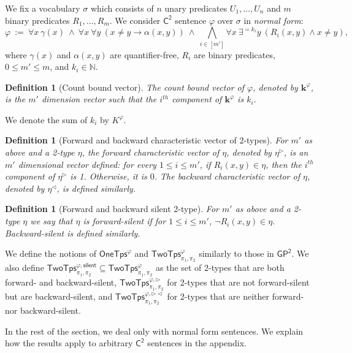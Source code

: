 \documentclass[10pt,a4paper]{article}
\newtheorem{definition}[theorem]{Definition}
\theoremstyle{definition}
\theoremstyle{remark}
\newcommand{\cK}{\mathsf{TwoTps}}
\newcommand{\bbN}{\mathbb{N}}
\newcommand{\bfk}{\mathbf{k}}
\newcommand{\vocab}{\sigma}
\newcommand{\Ctwo}    {\mathsf{C^2}}
\newcommand{\twotypes}{\mathsf{TwoTps}}
\newcommand{\Onetypes}{\mathsf{OneTps}}
\newcommand{\GPtwo}   {\mathsf{GP^2}}
\newcommand{\intsinterval}[1]{{\left[ #1 \right]}}
\newcommand{\trif} {\triangleright}
\newcommand{\trib} {\triangleleft}
\newcommand{\cKvpnull}  {\cK^{\varphi, \mathsf{silent}}}
\newcommand{\cKvpf}     {\cK^{\varphi, \trif}}
\newcommand{\cKvpfb}    {\cK^{\varphi, \trif\trib}}
\begin{document}
We fix a vocabulary $\vocab$ which consists of $n$ unary predicates $U_1, \ldots, U_n$ and $m$ binary predicates $R_1, \ldots, R_m$.
We consider $\Ctwo$ sentence $\varphi$ over $\vocab$ in \emph{normal form}:
\begin{equation*}
    \varphi\ :=\ 
    \forall x\ \gamma(x)\ \land\ 
    \forall x\ \forall y\ \left(x \neq y \to \alpha(x, y)\right)\ \land\ 
    \bigwedge_{i \in \intsinterval{m'}} \forall x\ \exists^{=k_i} y\ \left(R_i(x,y) \land x \neq y\right),
\end{equation*}
where $\gamma(x)$ and $\alpha(x, y)$ are quantifier-free,
$R_i$ are binary predicates,
$0 \le m' \le m$,
and $k_i \in \bbN$.

\begin{definition}[Count bound vector]
The count bound vector of $\varphi$, denoted by $\bfk^\varphi$, 
is the $m'$ dimension vector such that
the $i^{th}$ component of $\bfk^\varphi$ is $k_i$.
\end{definition}

We denote the sum of $k_i$ by $K^\varphi$.
\begin{definition}[Forward and backward characteristic vector of 2-types]
    For $m'$ as above and a 2-type $\eta$, the forward characteristic vector of $\eta$,
    denoted by $\eta^\trif$, is an $m'$ dimensional vector defined:
    for every $1 \le i \le m'$, if $R_i(x, y) \in \eta$,
    then the $i^{th}$ component of $\eta^\trif$ is 1.
    Otherwise, it is $0$.
    The backward characteristic vector of $\eta$,
    denoted by $\eta^\trib$,
    is defined similarly.
\end{definition}

\begin{definition}[Forward and backward silent 2-type]
    For $m'$ as above and a 2-type $\eta$ 
    we say that $\eta$ is forward-silent if for $1 \le i \le m'$,
    $\neg R_i(x, y) \in \eta$.
    Backward-silent is defined similarly.
\end{definition}

We define the notions of $\Onetypes^\varphi$ and $\twotypes^\varphi_{\pi_1, \pi_2}$ similarly to those in $\GPtwo$.
We also define
$\cKvpnull_{\pi_1, \pi_2} \subseteq \twotypes^\varphi_{\pi_1, \pi_2}$ as the set of 2-types that are both forward- and backward-silent,
$\cKvpf_{\pi_1, \pi_2}$ for 2-types that are not forward-silent but are backward-silent,
and
$\cKvpfb_{\pi_1, \pi_2}$ for 2-types that are neither forward- nor backward-silent.

In the rest of the section, we deal only with normal form sentences. We explain how the results apply to arbitrary $\Ctwo$ sentences in the appendix.
\end{document}

